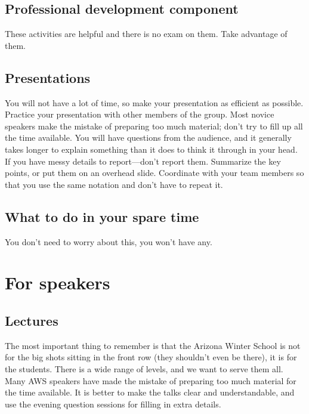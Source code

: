 \documentclass{article}
\begin{document}
\subsection{Professional development component}
\label{sec:prof-devel-comp}
These activities are helpful and there is no exam on them. Take
advantage of them.



\subsection{Presentations}
\label{sec:presentations}
You will not have a lot of time, so make your presentation as
efficient as possible. Practice your presentation with other members
of the group. Most novice speakers make the mistake of preparing too
much material; don't try to fill up all the time available. You will
have questions from the audience, and it generally takes longer to
explain something than it does to think it through in your head. If
you have messy details to report---don't report them. Summarize the
key points, or put them on an overhead slide. Coordinate with your
team members so that you use the same notation and don't have to
repeat it. 



\subsection{What to do in your spare time}
\label{sec:what-do-your}
You don't need to worry about this, you won't have any.


\section{For speakers}
\label{sec:speakers}


\subsection{Lectures}
\label{sec:lectures-1}
The most important thing to remember is that the Arizona Winter School
is not for the big shots sitting in the front row (they shouldn't even
be there),  it is for the students. There is a wide range of levels, and we
want to serve them all. Many AWS speakers have made the mistake of
preparing too much material for the time available. It is better to
make the talks clear and understandable, and use the evening question
sessions for filling in extra details.
\end{document}
